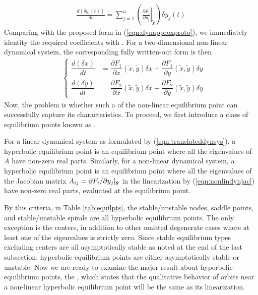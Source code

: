 \begin{align}
\frac{d(\delta y_i(t))}{dt} = \sum_{j=1}^{n}  \left(\left.\frac{\partial F_i}{\partial y_j}\right|_{\tilde{\textbf{y}}}\right) \delta y_j(t) \label{eqn:nonlindynjac}
\end{align}
Comparing with the proposed form in (\ref{eqn:dynapproxproto}), we immediately identity the required coefficients  with . For a two-dimensional non-linear dynamical system, the corresponding fully written-out form is then
\begin{align}
&\left\{\begin{alignedat}{1}
\dfrac{d(\delta x)}{dt} &= \dfrac{\partial F_1}{\partial x}(\tilde{x}, \tilde{y}) \delta x + \dfrac{\partial F_1}{\partial y}(\tilde{x}, \tilde{y}) \delta y \\
\dfrac{d(\delta y)}{dt} &= \dfrac{\partial F_2}{\partial x}(\tilde{x}, \tilde{y}) \delta x + \dfrac{\partial F_2}{\partial y}(\tilde{x}, \tilde{y}) \delta y
\end{alignedat}\right.
\end{align}
Now, the problem is whether such a  of the non-linear equilibrium point can successfully capture its characteristics. To proceed, we first introduce a class of equilibrium points known as .
\begin{defn}
For a linear dynamical system as formulated by (\ref{eqn:translateddynsys}), 
a hyperbolic equilibrium point is an equilibrium point where all the eigenvalues of $A$ have non-zero real parts. Similarly, for a non-linear dynamical system, a hyperbolic equilibrium point is an equilibrium point where all the eigenvalues of the Jacobian matrix $A_{ij} = \smash{\partial F_i/\partial y_j|_{\tilde{\textbf{y}}}}$ in the linearization by (\ref{eqn:nonlindynjac}) have non-zero real parts, evaluated at the equilibrium point.
\end{defn}
By this criteria, in Table \ref{tab:equilpts}, the stable/unstable nodes, saddle points, and stable/unstable spirals are all hyperbolic equilibrium points. The only exception is the centers, in addition to other omitted degenerate cases where at least one of the eigenvalues is strictly zero. Since stable equilibrium types excluding centers are all asymptotically stable as noted at the end of the last subsection, hyperbolic equilibrium points are either asymptotically stable or unstable. Now we are ready to examine the major result about hyperbolic equilibrium points, the , which states that the qualitative behavior of orbits near a non-linear hyperbolic equilibrium point will be the same as its linearization.
